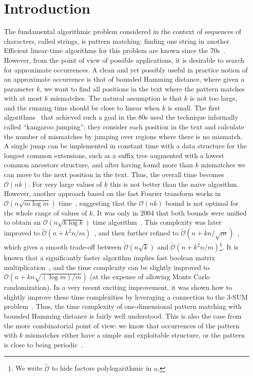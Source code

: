 \documentclass[11pt, letterpaper]{article}
\theoremstyle{plain}
\theoremstyle{definition}
\theoremstyle{remark}
\renewcommand{\O}{\mathcal{O}}
\newcommand{\tO}{\tilde{\mathcal{O}}}
\begin{document}
\section{Introduction}
The fundamental algorithmic problem considered in the context of sequences of characters, called strings, is pattern matching:
finding one string in another. Efficient linear-time algorithms for this problem are known since the 70s~\cite{Knuth1977}.
However, from the point of view of possible applications, it is desirable to search for approximate occurrences.
A clean and yet possibly useful in practice notion of an approximate occurrence is that of bounded Hamming distance,
where given a parameter $k$, we want to find all positions in the text where the pattern matches with at most $k$
mismatches. The natural assumption is that $k$ is not too large, and the running time should be close to linear
when $k$ is small. The first algorithms~\cite{Landau1986,Galil1986} that achieved such a goal in the 80s used the technique
informally called ``kangaroo jumping'': they consider each position in the text and calculate the number of mismatches
by jumping over regions where there is no mismatch. A single jump can be implemented in constant time with a
data structure for the longest common extensions, such as a suffix tree augmented with a lowest common ancestors structure,
and after having found more than $k$ mismatches we can move to the next position in the text. Thus, the overall
time becomes $\O(nk)$. For very large values of $k$ this is not better than the naive algorithm. However, another
approach based on the fast Fourier transform works in $\O(n \sqrt{m \log m})$ time~\cite{Abrahamson1987},
suggesting that the $\O(nk)$ bound is not optimal for the whole range of values of $k$. It was only in 2004 that
both bounds were unified to obtain an $\O(n\sqrt{k \log k})$ time algorithm~\cite{Amir2004}. This complexity
was later improved to $\tO(n + k^2n/m)$~\cite{Clifford2016a}, and then further refined to $\tO(n + kn/\sqrt{m})$~\cite{Gawrychowski2018},
which gives a smooth trade-off between $\tO(n\sqrt{k})$ and $\tO(n + k^2n/m)$\footnote{We write $\tO$ to hide factors polylogarithmic in $n$.}. 
It is known that a significantly faster algorithm implies fast boolean matrix multiplication~\cite{Gawrychowski2018},
and the time complexity can be slightly improved to $\O(n + kn\sqrt{(\log m) / m})$ \cite{Chan2020} (at the expense
of allowing Monte Carlo randomization). In a very recent exciting improvement, it was shown how to slightly improve
these time complexities by leveraging a connection to the 3-SUM problem~\cite{Chan0WX23}. Thus, the time complexity of one-dimensional pattern matching with bounded Hamming distance is fairly well understood.
This is also the case from the more combinatorial point of view: we know that occurrences of the pattern with $k$ mismatches
either have a simple and exploitable structure, or the pattern is close to being periodic~\cite{Bringmann2019,Charalampopoulos2020a}.
\end{document}
